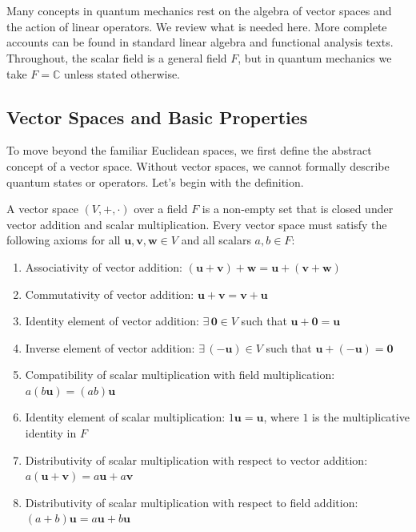 \section{\filetotitle}\label{sec:vector_spaces_and_linear_operators}
Many concepts in quantum mechanics rest on the algebra of vector spaces and the action of linear operators. We review what is needed here. More complete accounts can be found in standard linear algebra and functional analysis texts.\supercite{1406837723,633612145} Throughout, the scalar field is a general field $F$, but in quantum mechanics we take $F=\mathbb{C}$ unless stated otherwise.
\subsection{Vector Spaces and Basic Properties}\label{sec:vector_spaces_basic_properties}
To move beyond the familiar Euclidean spaces, we first define the abstract concept of a vector space. Without vector spaces, we cannot formally describe quantum states or operators. Let's begin with the definition.
\begin{definition}
A vector space $(V,+,\cdot)$ over a field $F$ is a non-empty set that is closed under vector addition and scalar multiplication. Every vector space must satisfy the following axioms for all $\symbf{u},\symbf{v},\symbf{w}\in V$ and all scalars $a,b\in F$:
\begin{enumerate}\def\labelenumi{\arabic{enumi}.}
\item Associativity of vector addition: $(\symbf{u}+\symbf{v})+\symbf{w}=\symbf{u}+(\symbf{v}+\symbf{w})$
\item Commutativity of vector addition: $\symbf{u}+\symbf{v}=\symbf{v}+\symbf{u}$
\item Identity element of vector addition: $\exists\,\symbf{0}\in V$ such that $\symbf{u}+\symbf{0}=\symbf{u}$
\item Inverse element of vector addition: $\exists\,(-\symbf{u})\in V$ such that $\symbf{u}+(-\symbf{u})=\symbf{0}$
\item Compatibility of scalar multiplication with field multiplication: $a(b\symbf{u})=(ab)\symbf{u}$
\item Identity element of scalar multiplication: $1\symbf{u}=\symbf{u}$, where $1$ is the multiplicative identity in $F$
\item Distributivity of scalar multiplication with respect to vector addition: $a(\symbf{u}+\symbf{v})=a\symbf{u}+a\symbf{v}$
\item Distributivity of scalar multiplication with respect to field addition: $(a+b)\symbf{u}=a\symbf{u}+b\symbf{u}$
\end{enumerate}
\end{definition}
